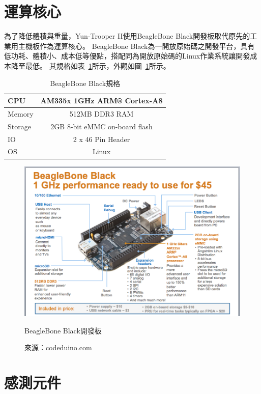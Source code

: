 \section{運算核心}
為了降低體積與重量，Yun-Trooper II使用BeagleBone Black開發板取代原先的工業用主機板作為運算核心。
BeagleBone Black為一開放原始碼之開發平台，具有低功耗、體積小、成本低等優點，搭配同為開放原始碼的Linux作業系統讓開發成本降至最低。
其規格如表~\ref{t:beagleboneblack-specs}所示，外觀如圖~\ref{f:beagleboneblack-specs}所示。

\begin{table}[h!]
	\centering
	\caption{BeagleBone Black規格}
	\label{t:beagleboneblack-specs}
	\begin{tabular}{ | l | c |}
		\hline
		CPU & AM335x 1GHz ARM® Cortex-A8 \\ \hline
		Memory & 512MB DDR3 RAM \\ \hline
		Storage & 2GB 8-bit eMMC on-board flash \\ \hline
		IO & 2 x 46 Pin Header \\ \hline 
		OS & Linux \\
		\hline
	\end{tabular}
\end{table}

\begin{figure}[h!]
	\centering
	\includegraphics[width=\textwidth]{figures/beagleboneblack-specs}
	\caption{BeagleBone Black開發板}
	\caption*{來源：codeduino.com}
	\label{f:beagleboneblack-specs}
\end{figure}

\section{感測元件}
